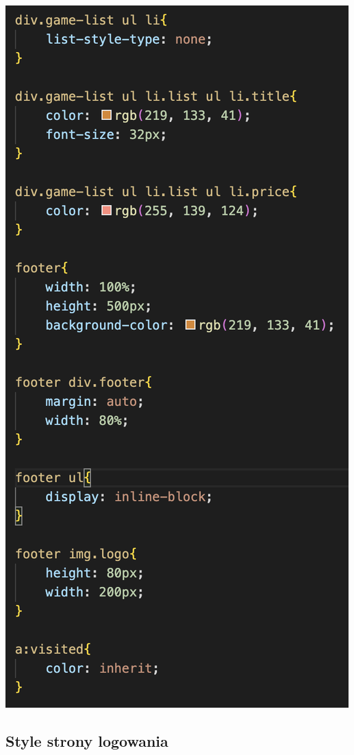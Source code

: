 \documentclass[12pt, letterpaper]{article}
\begin{document}
\begin{center}
	\includegraphics[scale=0.6]{style4}
\end{center}

\subsection{Style strony logowania}
\end{document}
